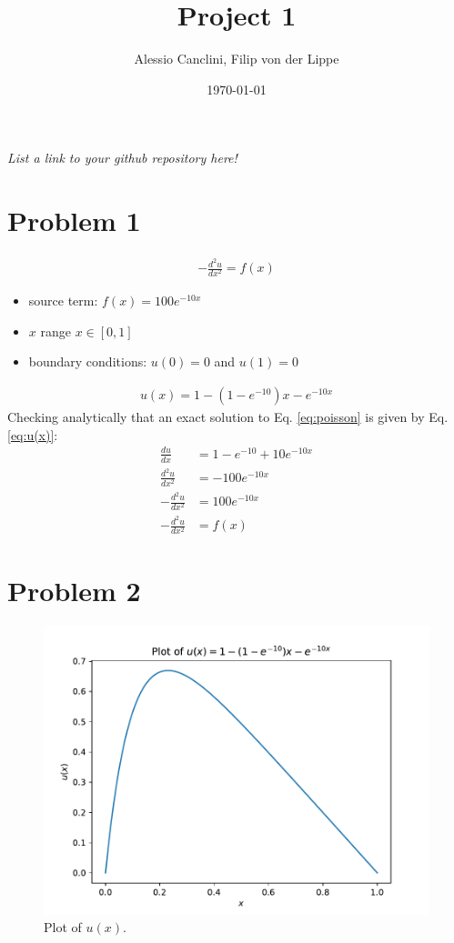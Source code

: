 \documentclass[english,notitlepage]{revtex4-1}  %
\begin{document}
\title{Project 1}      %
\author{Alessio Canclini, Filip von der Lippe}          %
\date{\today}                             %
\noaffiliation                            %


\maketitle

\textit{List a link to your github repository here!}

\section*{Problem 1}
\begin{align}
  - \frac{d^2u}{dx^2} = f(x)
  \label{eq:poisson}
\end{align}
\begin{itemize}
  \item source term: $f(x) = 100e^{-10x}$
  \item $x$ range $x \in [0,1]$
  \item boundary conditions: $u(0) = 0$ and $u(1) = 0$
\end{itemize}
\begin{align}
  u(x) = 1 - (1 - e^{-10})x- e^{-10x}
  \label{eq:u(x)}
\end{align}
Checking analytically that an exact solution to Eq. \ref{eq:poisson} is given by Eq. \ref{eq:u(x)}:
\begin{align*}
  \frac{du}{dx} & = 1 - e^{-10} + 10e^{-10x} \\
  \frac{d^2u}{dx^2} & = -100e^{-10x} \\
  -\frac{d^2u}{dx^2} & = 100e^{-10x} \\
  -\frac{d^2u}{dx^2} & = f(x)
\end{align*}

\section*{Problem 2}
\begin{figure}[H]
  \includegraphics{../figures/x_u_plot.pdf}
  \caption{Plot of $u(x)$.}
  \label{fig:x_u}
\end{figure}
\end{document}

